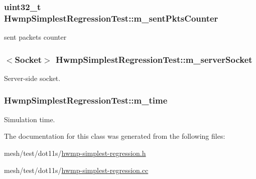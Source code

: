 \subsubsection[{\texorpdfstring{m\+\_\+sent\+Pkts\+Counter}{m_sentPktsCounter}}]{\setlength{\rightskip}{0pt plus 5cm}uint32\+\_\+t Hwmp\+Simplest\+Regression\+Test\+::m\+\_\+sent\+Pkts\+Counter\hspace{0.3cm}{\ttfamily [private]}}\hypertarget{classHwmpSimplestRegressionTest_a9a703951eb0484cc32bca9e7494380fe}{}\label{classHwmpSimplestRegressionTest_a9a703951eb0484cc32bca9e7494380fe}


sent packets counter 

\subsubsection[{\texorpdfstring{m\+\_\+server\+Socket}{m_serverSocket}}]{$<${\bf Socket}$>$ Hwmp\+Simplest\+Regression\+Test\+::m\+\_\+server\+Socket\hspace{0.3cm}{\ttfamily [private]}}\hypertarget{classHwmpSimplestRegressionTest_a6c524b9c42bb0305d006c13a87a58abb}{}\label{classHwmpSimplestRegressionTest_a6c524b9c42bb0305d006c13a87a58abb}


Server-\/side socket. 

\subsubsection[{\texorpdfstring{m\+\_\+time}{m_time}}]{ Hwmp\+Simplest\+Regression\+Test\+::m\+\_\+time\hspace{0.3cm}{\ttfamily [private]}}\hypertarget{classHwmpSimplestRegressionTest_a6ab9b62ebf4c8ca11cc474cec79359e5}{}\label{classHwmpSimplestRegressionTest_a6ab9b62ebf4c8ca11cc474cec79359e5}


Simulation time. 



The documentation for this class was generated from the following files\+:\begin{DoxyCompactItemize}
\item 
mesh/test/dot11s/\hyperlink{hwmp-simplest-regression_8h}{hwmp-\/simplest-\/regression.\+h}\item 
mesh/test/dot11s/\hyperlink{hwmp-simplest-regression_8cc}{hwmp-\/simplest-\/regression.\+cc}\end{DoxyCompactItemize}
